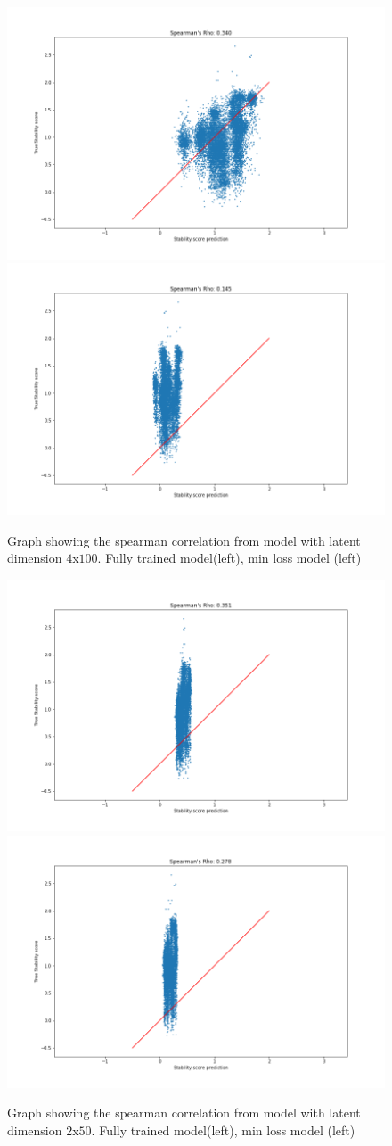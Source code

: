 \begin{figure}[!ht]
  \centering
  \includegraphics[width=0.4\linewidth]{latex/imgs/CNN_spearman_correlation_100_fully.png}
  \includegraphics[width=0.4\linewidth]{latex/imgs/CNN_spearman_correlation_100_best.png}
  \caption{Graph showing the spearman correlation from model with latent dimension $4$x$100$. Fully trained model(left), min loss model (left)}
  \label{fig:stab_100}
\end{figure}

\begin{figure}[!ht]
  \centering
  \includegraphics[width=0.4\linewidth]{latex/imgs/CNN_spearman_correlation_50_fully.png}
  \includegraphics[width=0.4\linewidth]{latex/imgs/CNN_spearman_correlation_50_best.png}
  \caption{Graph showing the spearman correlation from model with latent dimension $2$x$50$. Fully trained model(left), min loss model (left)}
  \label{fig:stab_50}
\end{figure}